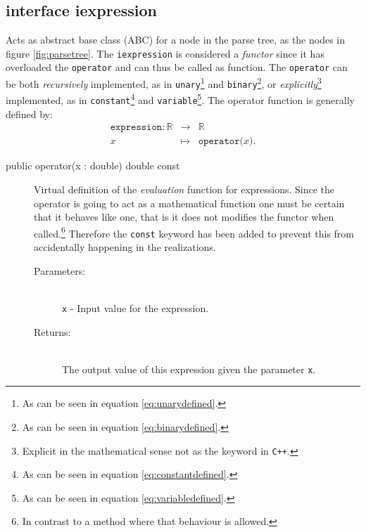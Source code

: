 \documentclass[a4paper,11pt]{kth-mag}
\newcommand{\RR}{\ensuremath{\mathbb{R}}}
\newcommand{\Cpp}{\texttt{C++}}
\begin{document}
\subsection{interface iexpression}
\label{sec:iexpression}
Acts as abstract base class (ABC) for a node in the parse
tree, as the nodes in figure \ref{fig:parsetree}. The
\texttt{iexpression} is considered a \emph{functor} since it has overloaded the
\texttt{operator} and can thus be called as function.
The \texttt{operator} can be both 
\emph{recursively} implemented, as in
    \texttt{unary}\footnote{As can be seen in equation \ref{eq:unarydefined}.} 
    and
    \texttt{binary}\footnote{As can be seen in equation \ref{eq:binarydefined}.}, or
\emph{explicitly}\footnote{Explicit in the mathematical sense not as the keyword
in \Cpp.} implemented, as in 
    \texttt{constant}\footnote{As can be seen in equation \ref{eq:constantdefined}.} 
    and
    \texttt{variable}\footnote{As can be seen in equation \ref{eq:variabledefined}.}.
The operator function is generally defined by:
\begin{eqnarray}
    \label{eq:expressiondefined}
    \texttt{expression}: \RR &\rightarrow& \RR \nonumber \\
    x &\mapsto& \texttt{operator(}x\texttt{)} .
\end{eqnarray}

\begin{description}
    \item[public operator(x : double) double const] 
    Virtual definition of the \emph{evaluation} function for expressions. 
    Since the operator is going to act as a mathematical function one must be certain
    that it behaves like one, that is it does not modifies the functor when
    called.\footnote{In contrast to a method where that behaviour is allowed.}
    Therefore the \texttt{const} keyword has been added to prevent this
    from accidentally happening in the realizations.
    \begin{description}
        \item[Parameters:]~\\
            \verb+x+ - Input value for the expression. 
        \item[Returns:]~\\
            The output value of this expression given the parameter \texttt{x}.
    \end{description}
\end{description}
\end{document}
